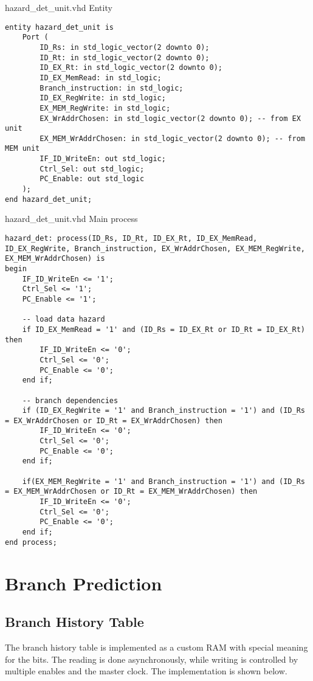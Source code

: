 \documentclass[a4paper,12pt]{report}
\begin{document}
\begin{my-listing}{hazard\_det\_unit.vhd Entity}
    \begin{lstlisting}[style=vhdl]
entity hazard_det_unit is
    Port (
        ID_Rs: in std_logic_vector(2 downto 0); 
        ID_Rt: in std_logic_vector(2 downto 0); 
        ID_EX_Rt: in std_logic_vector(2 downto 0);
        ID_EX_MemRead: in std_logic; 
        Branch_instruction: in std_logic;
        ID_EX_RegWrite: in std_logic;
        EX_MEM_RegWrite: in std_logic;
        EX_WrAddrChosen: in std_logic_vector(2 downto 0); -- from EX unit
        EX_MEM_WrAddrChosen: in std_logic_vector(2 downto 0); -- from MEM unit
        IF_ID_WriteEn: out std_logic;
        Ctrl_Sel: out std_logic;
        PC_Enable: out std_logic
    );
end hazard_det_unit;
    \end{lstlisting}
\end{my-listing}

\begin{my-listing}{hazard\_det\_unit.vhd Main process}
    \begin{lstlisting}[style=vhdl]
hazard_det: process(ID_Rs, ID_Rt, ID_EX_Rt, ID_EX_MemRead, ID_EX_RegWrite, Branch_instruction, EX_WrAddrChosen, EX_MEM_RegWrite, EX_MEM_WrAddrChosen) is
begin
    IF_ID_WriteEn <= '1';
    Ctrl_Sel <= '1';
    PC_Enable <= '1';
    
    -- load data hazard
    if ID_EX_MemRead = '1' and (ID_Rs = ID_EX_Rt or ID_Rt = ID_EX_Rt) then
        IF_ID_WriteEn <= '0';
        Ctrl_Sel <= '0';
        PC_Enable <= '0';                    
    end if;
    
    -- branch dependencies
    if (ID_EX_RegWrite = '1' and Branch_instruction = '1') and (ID_Rs = EX_WrAddrChosen or ID_Rt = EX_WrAddrChosen) then
        IF_ID_WriteEn <= '0';
        Ctrl_Sel <= '0';
        PC_Enable <= '0'; 
    end if;   
    
    if(EX_MEM_RegWrite = '1' and Branch_instruction = '1') and (ID_Rs = EX_MEM_WrAddrChosen or ID_Rt = EX_MEM_WrAddrChosen) then
        IF_ID_WriteEn <= '0';
        Ctrl_Sel <= '0';
        PC_Enable <= '0'; 
    end if;        
end process;
    \end{lstlisting}
\end{my-listing}

\section{Branch Prediction}
\subsection{Branch History Table}
The branch history table is implemented as a custom RAM with special meaning for the bits. The reading is done asynchronously, while writing is controlled by multiple enables and the master clock. The implementation is shown below.
\end{document}
